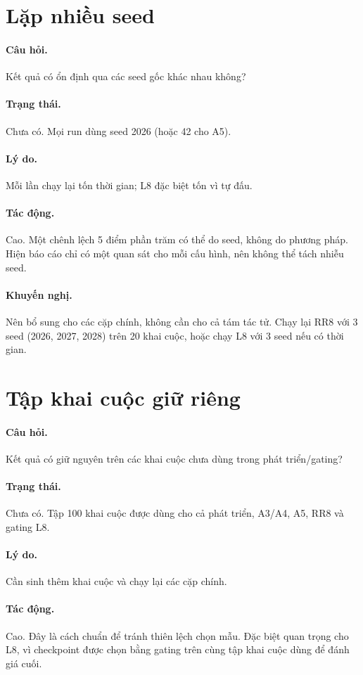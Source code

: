 \section{Lặp nhiều seed}
\paragraph{Câu hỏi.} Kết quả có ổn định qua các seed gốc khác nhau không?
\paragraph{Trạng thái.} Chưa có. Mọi run dùng seed 2026 (hoặc 42 cho A5).
\paragraph{Lý do.} Mỗi lần chạy lại tốn thời gian; L8 đặc biệt tốn vì tự đấu.
\paragraph{Tác động.} Cao. Một chênh lệch 5 điểm phần trăm có thể do seed, không do phương pháp.
Hiện báo cáo chỉ có một quan sát cho mỗi cấu hình, nên không thể tách nhiễu seed.
\paragraph{Khuyến nghị.} Nên bổ sung cho các cặp chính, không cần cho cả tám tác tử. Chạy lại
RR8 với 3 seed (2026, 2027, 2028) trên 20 khai cuộc, hoặc chạy L8 với 3 seed nếu có thời gian.

\section{Tập khai cuộc giữ riêng}
\paragraph{Câu hỏi.} Kết quả có giữ nguyên trên các khai cuộc chưa dùng trong phát triển/gating?
\paragraph{Trạng thái.} Chưa có. Tập 100 khai cuộc được dùng cho cả phát triển, A3/A4, A5, RR8
và gating L8.
\paragraph{Lý do.} Cần sinh thêm khai cuộc và chạy lại các cặp chính.
\paragraph{Tác động.} Cao. Đây là cách chuẩn để tránh thiên lệch chọn mẫu. Đặc biệt quan trọng
cho L8, vì checkpoint được chọn bằng gating trên cùng tập khai cuộc dùng để đánh giá cuối.
